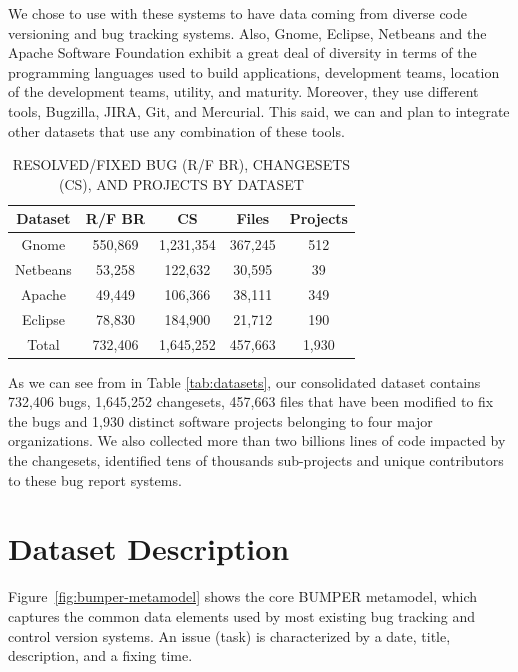 \documentclass{sig-alternate-05-2015}
\begin{document}
We chose to use with these systems to have data coming from
diverse code versioning and bug tracking systems.
Also, Gnome, Eclipse, Netbeans and the Apache Software Foundation exhibit a
great deal of diversity in terms of the programming
languages used to build applications, development teams,
location of the development teams, utility, and maturity.
Moreover, they use different tools, Bugzilla, JIRA, Git, and
Mercurial. This said, we can and plan to integrate other datasets that
use any combination of these tools.

\begin{table}[]
\centering
\caption{
RESOLVED/FIXED BUG (R/F BR),  CHANGESETS (CS), AND
PROJECTS BY DATASET \label{tab:datasets}}
\label{tab:summary}
\begin{tabular}{c|c|c|c|c}
\textbf{Dataset} & \textbf{R/F BR} & \textbf{CS} & \textbf{Files} & \textbf{Projects} \\ \hline \hline
Gnome            & 550,869         & 1,231,354   & 367,245        & 512                \\ \hline
Netbeans         & 53,258          & 122,632     & 30,595         & 39                \\ \hline
Apache           & 49,449          & 106,366     & 38,111         & 349               \\ \hline
Eclipse          & 78,830          & 184,900     & 21,712         & 190                \\ \hline \hline
Total            & 732,406         & 1,645,252   & 457,663        & 1,930               \\ \hline \hline
\end{tabular}
\end{table}

As we can see from in Table \ref{tab:datasets}, our consolidated dataset contains 732,406 bugs,
1,645,252 changesets, 457,663 files that have been modified to fix the bugs
and 1,930 distinct software projects belonging to four major organizations.
We also collected more than two billions lines of code impacted by the
changesets, identified tens of thousands sub-projects and unique contributors
to these bug report systems.



\section{Dataset Description}
\label{sec:Dataset Description}

Figure~\ref{fig:bumper-metamodel}  shows the core BUMPER metamodel,
which captures the common data elements used by most existing
bug tracking and control version systems. An issue (task) is
characterized by a date, title, description, and a fixing time.
\end{document}
